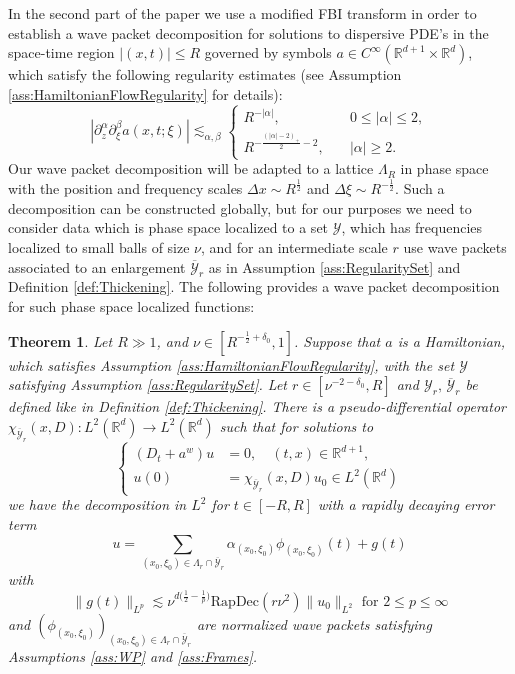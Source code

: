 \documentclass{amsart}
\newtheorem{theorem}{Theorem}[section]
\theoremstyle{definition}
\newcommand{\R}{\mathbb{R}}
\begin{document}
In the second part of the paper we use a modified FBI transform in order to establish a wave packet decomposition  for solutions to dispersive PDE's in the space-time region $|(x,t)| \leq R$ governed by symbols $a \in C^{\infty}(\R^{d+1} \times \R^d)$, which satisfy the following regularity estimates (see Assumption \ref{ass:HamiltonianFlowRegularity} for details):
\begin{equation*}
        |\partial_z^{\alpha} \partial_{\xi}^{\beta} a(x,t;\xi)| \lesssim_{\alpha,\beta} \begin{cases}
            R^{-|\alpha|}, &\quad 0 \leq |\alpha| \leq 2, \\
            R^{- \frac{(|\alpha|-2)_+}{2}-2}, &\quad |\alpha| \geq 2.
        \end{cases}
\end{equation*}
 Our wave packet decomposition will be adapted to a lattice $\Lambda_R$ in phase space with the position and frequency scales $\Delta x \sim R^{\frac{1}{2}}$ and $\Delta \xi \sim R^{-\frac{1}{2}}$. Such a decomposition can be constructed globally, but for our purposes we need to 
 consider data which is phase space localized to a set $\mathcal{Y}$, which has frequencies localized to small balls of size $\nu$, and for an intermediate scale $r$ use wave packets associated to an enlargement $\overline{\mathcal{Y}}_r$ as in Assumption \ref{ass:RegularitySet} and Definition \ref{def:Thickening}.
 The following  provides a wave packet decomposition for such phase space localized functions: 
\begin{theorem}
\label{thm:WavePacketDecompositions}
Let $R \gg 1$, and $\nu \in [R^{-\frac{1}{2}+\delta_0},1]$. Suppose that $a$ is a Hamiltonian, which satisfies Assumption \ref{ass:HamiltonianFlowRegularity}, with the set $\mathcal{Y}$ satisfying Assumption \ref{ass:RegularitySet}. Let $r \in [\nu^{-2-\delta_0},R]$ and $\mathcal{Y}_r, \, \overline{\mathcal{Y}}_r$ be defined like in Definition \ref{def:Thickening}. 
There is a pseudo-differential operator $\chi_{\overline{\mathcal{Y}}_r}(x,D): L^2(\R^d) \to L^2(\R^d)$ such that for solutions to
\begin{equation*}
\left\{ \begin{array}{cl}
(D_t + a^w) u &= 0, \quad (t,x) \in \R^{d+1}, \\
u(0) &= \chi_{\overline{\mathcal{Y}}_r}(x,D) u_0 \in L^2(\R^d)
\end{array} \right.
\end{equation*}
we have the decomposition in $L^2$ for $t \in [-R,R]$ with a rapidly decaying error term
\begin{equation*}
u = \sum_{(x_0,\xi_0) \in \Lambda_r \cap \overline{\mathcal{Y}}_r} \alpha_{(x_0,\xi_0)} \phi_{(x_0,\xi_0)}(t) + g(t)
\end{equation*}
with
\begin{equation*}
    \| g(t) \|_{L^p} \lesssim \nu^{d \big( \frac12 - \frac1p \big)} \text{RapDec}(r \nu^2) \| u_0 \|_{L^2} \text{ for } 2 \leq p \leq \infty
\end{equation*} 
and $(\phi_{(x_0,\xi_0)})_{(x_0,\xi_0) \in \Lambda_r \cap \overline{\mathcal{Y}}_r}$ are normalized wave packets satisfying Assumptions \ref{ass:WP} and \ref{ass:Frames}.
\end{theorem}
\end{document}
